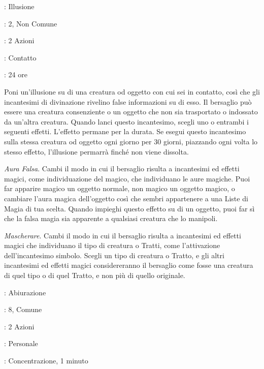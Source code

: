 \begin{multicols}{2}
\noindent\colorbox{OBSSgold!10}{
\begin{minipage}{0.95\linewidth}
\begin{description}[noitemsep, topsep=0pt, parsep=0pt, partopsep=0pt, leftmargin=0cm, labelwidth=1.3cm]
	\item[\textbf{Lista}]: Illusione
	\item[\textbf{Livello}]: 2, Non Comune
	\item[\textbf{Lancio}]: 2 Azioni
	\item[\textbf{Gittata}]: Contatto
	\item[\textbf{Durata}]: 24 ore
\end{description}
\end{minipage}}\smallskip

Poni un'illusione su di una creatura od oggetto con cui sei in contatto, così che gli incantesimi di divinazione rivelino false informazioni su di esso. Il bersaglio può essere una creatura consenziente o un oggetto che non sia trasportato o indossato da un'altra creatura. Quando lanci questo incantesimo, scegli uno o entrambi i seguenti effetti. L'effetto permane per la durata. Se esegui questo incantesimo sulla stessa creatura od oggetto ogni giorno per 30 giorni, piazzando ogni volta lo stesso effetto, l'illusione permarrà finché non viene dissolta.

\emph{Aura Falsa}. Cambi il modo in cui il bersaglio risulta a incantesimi ed effetti magici, come individuazione del magico, che individuano le aure magiche. Puoi far apparire magico un oggetto normale, non magico un oggetto magico, o cambiare l'aura magica dell'oggetto così che sembri appartenere a una Liste di Magia di tua scelta. Quando impieghi questo effetto su di un oggetto, puoi far sì che la falsa magia sia apparente a qualsiasi creatura che lo manipoli.

\emph{Mascherare}. Cambi il modo in cui il bersaglio risulta a incantesimi ed effetti magici che individuano il tipo di creatura o Tratti, come l'attivazione dell'incantesimo simbolo. Scegli un tipo di creatura o Tratto, e gli altri incantesimi ed effetti magici considereranno il bersaglio come fosse una creatura di quel tipo o di quel Tratto, e non più di quello originale.

\noindent\colorbox{OBSSgold!10}{
\begin{minipage}{0.95\linewidth}
\begin{description}[noitemsep, topsep=0pt, parsep=0pt, partopsep=0pt, leftmargin=0cm, labelwidth=1.3cm]
	\item[\textbf{Lista}]: Abiurazione
	\item[\textbf{Livello}]: 8, Comune
	\item[\textbf{Lancio}]: 2 Azioni
	\item[\textbf{Gittata}]: Personale
	\item[\textbf{Durata}]: Concentrazione, 1 minuto
\end{description}
\end{minipage}}\smallskip


\end{multicols}
